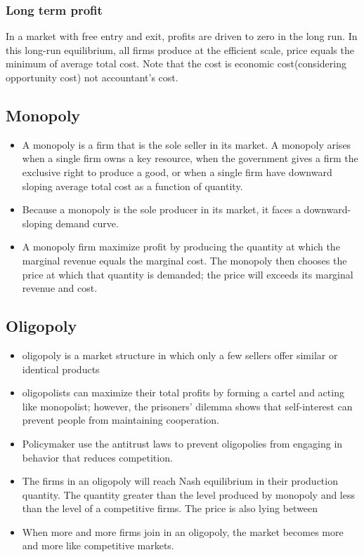 \documentclass[a4paper,13pt]{report}
\begin{document}
\subsubsection{Long term profit}
In a market with free entry and exit, profits are driven to zero in the long run. In this long-run equilibrium, all firms produce at the efficient scale, price equals the minimum of average total cost. Note that the cost is economic cost(considering opportunity cost) not accountant's cost.


\subsection{Monopoly}
\begin{itemize}
    \item A monopoly is a firm that is the sole seller in its market. A monopoly arises when a single firm owns a key resource, when the government gives a firm the exclusive right to produce a good, or when a single firm have downward sloping average total cost as a function of quantity.
    \item Because a monopoly is the sole producer in its market, it faces a downward-sloping demand curve.
    \item A monopoly firm maximize profit by producing the quantity at which the marginal revenue equals the marginal cost. The monopoly then chooses the price at which that quantity is demanded; the price will exceeds its marginal revenue and cost.
\end{itemize} 

\subsection{Oligopoly}
\begin{itemize}
    \item oligopoly is a market structure in which only a few sellers offer similar or identical products
    \item oligopolists can maximize their total profits by forming a cartel and acting like monopolist; however, the prisoners' dilemma shows that self-interest can prevent people from maintaining cooperation. 
    \item Policymaker use the antitrust laws to prevent oligopolies from engaging in behavior that reduces competition.
    \item The firms in an oligopoly will reach Nash equilibrium in their production quantity. The quantity greater than the level produced by monopoly and less than the level of a competitive firms. The price is also lying between
    \item When more and more firms join in an oligopoly, the market becomes more and more like competitive markets. 
\end{itemize}
\end{document}
